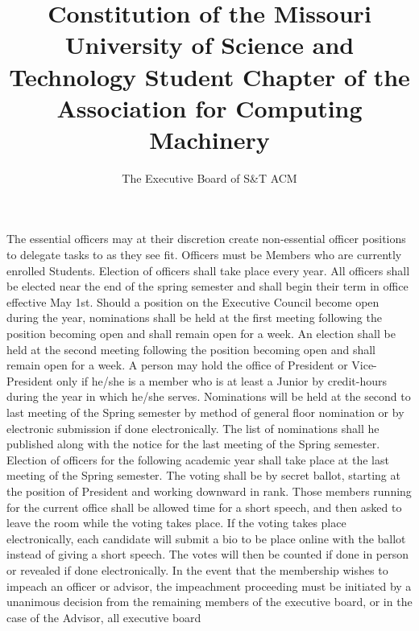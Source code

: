 \documentclass[11pt,a4paper,notitlepage]{article}
\author{The Executive Board of S\&T ACM}
\title{Constitution of the Missouri University of Science and Technology Student Chapter of the Association for Computing Machinery}
\begin{document}
\maketitle


\pagebreak
\tableofcontents








\iffalse
The essential officers may at their discretion create non-essential officer
positions to delegate tasks to as they see fit. Officers must be Members who are
currently enrolled Students. Election of officers shall take place every year.
All officers shall be elected near the end of the spring semester and shall
begin their term in office effective May 1st. Should a position on the Executive
Council become open during the year, nominations shall be held at the first
meeting following the position becoming open and shall remain open for a week.
An election shall be held at the second meeting following the position becoming
open and shall remain open for a week. A person may hold the office of President
or Vice-President only if he/she is a member who is at least a Junior by
credit-hours during the year in which he/she serves. Nominations will be held at
the second to last meeting of the Spring semester by method of general floor
nomination or by electronic submission if done electronically. The list of
nominations shall he published along with the notice for the last meeting of the
Spring semester. Election of officers for the following academic year shall take
place at the last meeting of the Spring semester. The voting shall be by secret
ballot, starting at the position of President and working downward in rank.
Those members running for the current office shall be allowed time for a short
speech, and then asked to leave the room while the voting takes place. If the
voting takes place electronically, each candidate will submit a bio to be place
online with the ballot instead of giving a short speech. The votes will then be
counted if done in person or revealed if done electronically. In the event that
the membership wishes to impeach an officer or advisor, the impeachment
proceeding must be initiated by a unanimous decision from the remaining members
of the executive board, or in the case of the Advisor, all executive board
\end{document}
